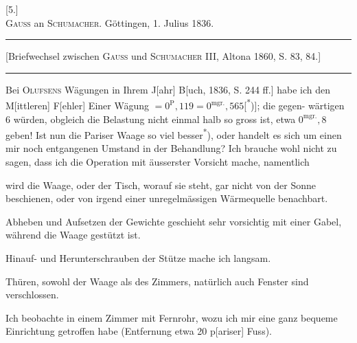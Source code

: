 \clearpage\begingroup{}
\begin{center}
[5.]\\[.7em]
\textsc{Gauss} an \textsc{Schumacher}. Göttingen, 1. Julius 1836.
\par\medskip\rule{.78\textwidth}{.35pt}\par
{\small [Briefwechsel zwischen \textsc{Gauss} und \textsc{Schumacher} III, Altona 1860, S. 83, 84.]}\par
\rule{.78\textwidth}{.35pt}
\end{center}
\noindent\hspace*{\parindent}Bei \textsc{Olufsens} Wägungen in Ihrem J[ahr] B[uch, 1836, S. 244 ff.] habe ich
den M[ittleren] F[ehler] Einer Wägung \(=0^{\mathrm{P}}{,}119=0^{\mathrm{mgr.}}{,}565\)[\textsuperscript{*})]\begingroup\renewcommand{\thefootnote}{}\endgroup; die gegen-\HistoricalFoot{}{4\textsuperscript{*}}
\clearpage{}
\noindent wärtigen 6 würden, obgleich die Belastung nicht einmal halb so gross ist,
etwa \(0^{\mathrm{mgr.}}{,}8\) geben! Ist nun die Pariser Waage so viel besser\textsuperscript{*})\begingroup\renewcommand{\thefootnote}{}\endgroup, oder handelt
es sich um einen mir noch entgangenen Umstand in der Behandlung? Ich
brauche wohl nicht zu sagen, dass ich die Operation mit äusserster Vorsicht
mache, namentlich
\begin{list}{}{\setlength{\leftmargin}{2.5em}\setlength{\labelwidth}{1.3em}\setlength{\labelsep}{.4em}\setlength{\itemsep}{0pt}\setlength{\parsep}{0pt}\setlength{\topsep}{0pt}}
\item[1)] wird die Waage, oder der Tisch, worauf sie steht, gar nicht von der
Sonne beschienen, oder von irgend einer unregelmässigen Wärmequelle
benachbart.
\item[2)] Abheben und Aufsetzen der Gewichte geschieht sehr vorsichtig mit
einer Gabel, während die Waage gestützt ist.
\item[3)] Hinauf- und Herunterschrauben der Stütze mache ich  langsam.
\item[4)] Thüren, sowohl der Waage als des Zimmers, natürlich auch Fenster
sind verschlossen.
\item[5)] Ich beobachte in einem  Zimmer mit Fernrohr, wozu ich mir
eine ganz bequeme Einrichtung getroffen habe (Entfernung etwa 20
p[ariser] Fuss).
\end{list}
